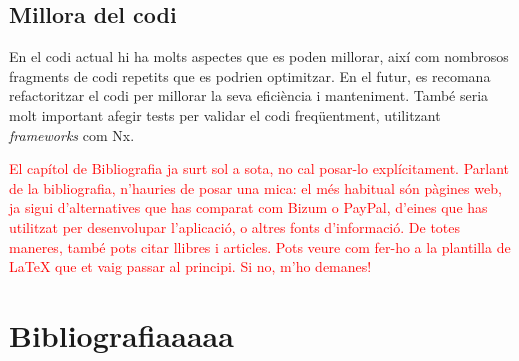 \documentclass[a4paper,12pt,twoside]{ThesisStyle}
\newcommand{\pau}[1]{\textcolor{red}{#1}}
\begin{document}
\section{Millora del codi}
\label{sec: Millora del codi}


En el codi actual hi ha molts aspectes que es poden millorar, així com nombrosos fragments de codi repetits que es podrien optimitzar. En el futur, es recomana refactoritzar el codi per millorar la seva eficiència i manteniment. També seria molt important afegir tests per validar el codi freqüentment, utilitzant \textit{frameworks} com Nx.




\pau{El capítol de Bibliografia ja surt sol a sota, no cal posar-lo explícitament. Parlant de la bibliografia, n'hauries de posar una mica: el més habitual són pàgines web, ja sigui d'alternatives que has comparat com Bizum o PayPal, d'eines que has utilitzat per desenvolupar l'aplicació, o altres fonts d'informació. De totes maneres, també pots citar llibres i articles. Pots veure com fer-ho a la plantilla de LaTeX que et vaig passar al principi. Si no, m'ho demanes!}





\chapter{Bibliografiaaaaa}
\renewcommand{\bibsection}{} %















\end{document}
